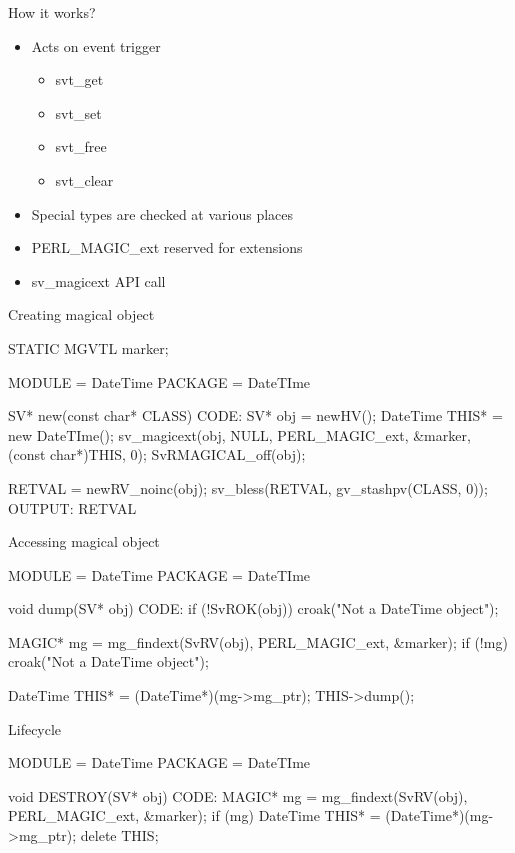 \documentclass[mathserif,hyperref={urlcolor=cyan,colorlinks=true}]{beamer}
\begin{document}
\begin{frame}{How it works?}
\begin{itemize}
\item<1-> Acts on event trigger
    \begin{itemize}
    \item<1-> svt{\_}get
    \item<1-> svt{\_}set
    \item<1-> svt{\_}free
    \item<1-> svt{\_}clear
    \end{itemize}
\item<2-> Special types are checked at various places
\item<3-> PERL{\_}MAGIC{\_}ext reserved for extensions
\item<3-> sv{\_}magicext API call
\end{itemize}
\end{frame}

\begin{frame}[fragile]{Creating magical object}
\begin{ccode}
STATIC MGVTL marker;

MODULE = DateTime   PACKAGE = DateTIme

SV*
new(const char* CLASS)
CODE:
    SV* obj = newHV();
    DateTime THIS* = new DateTIme();
    sv_magicext(obj, NULL, PERL_MAGIC_ext, &marker,
        (const char*)THIS, 0);
    SvRMAGICAL_off(obj);

    RETVAL = newRV_noinc(obj);
    sv_bless(RETVAL, gv_stashpv(CLASS, 0));
OUTPUT:
    RETVAL
\end{ccode}
\end{frame}

\begin{frame}[fragile]{Accessing magical object}
\begin{ccode}
MODULE = DateTime   PACKAGE = DateTIme

void
dump(SV* obj)
CODE:
    if (!SvROK(obj)) croak("Not a DateTime object");

    MAGIC* mg = mg_findext(SvRV(obj), PERL_MAGIC_ext, &marker);
    if (!mg) croak("Not a DateTime object");

    DateTime THIS* = (DateTime*)(mg->mg_ptr);
    THIS->dump();
\end{ccode}
\end{frame}

\begin{frame}[fragile]{Lifecycle}
\begin{ccode}
MODULE = DateTime   PACKAGE = DateTIme

void
DESTROY(SV* obj)
CODE:
    MAGIC* mg = mg_findext(SvRV(obj), PERL_MAGIC_ext, &marker);
    if (mg) {
        DateTime THIS* = (DateTime*)(mg->mg_ptr);
        delete THIS;
    }
\end{ccode}
\end{frame}
\end{document}
